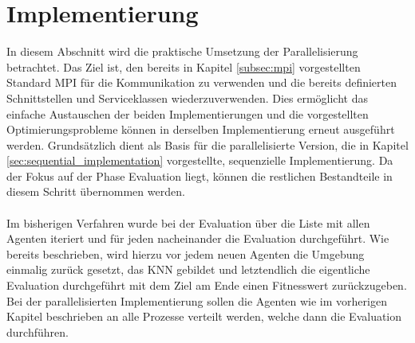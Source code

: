 \section{Implementierung} %
In diesem Abschnitt wird die praktische Umsetzung der Parallelisierung betrachtet. Das Ziel ist, den bereits in Kapitel \ref{subsec:mpi} vorgestellten Standard \ac{MPI} für die Kommunikation zu verwenden und die bereits definierten Schnittstellen und Serviceklassen wiederzuverwenden. Dies ermöglicht das einfache Austauschen der beiden Implementierungen und die vorgestellten Optimierungsprobleme können in derselben Implementierung erneut ausgeführt werden. Grundsätzlich dient als Basis für die parallelisierte Version, die in Kapitel \ref{sec:sequential_implementation} vorgestellte, sequenzielle Implementierung. Da der Fokus auf der Phase Evaluation liegt, können die restlichen Bestandteile in diesem Schritt übernommen werden.
\\\\
Im bisherigen Verfahren wurde bei der Evaluation über die Liste mit allen Agenten iteriert und für jeden nacheinander die Evaluation durchgeführt. Wie bereits beschrieben, wird hierzu vor jedem neuen Agenten die Umgebung einmalig zurück gesetzt, das \ac{KNN} gebildet und letztendlich die eigentliche Evaluation durchgeführt mit dem Ziel am Ende einen Fitnesswert zurückzugeben. Bei der parallelisierten Implementierung sollen die Agenten wie im vorherigen Kapitel beschrieben an alle Prozesse verteilt werden, welche dann die Evaluation durchführen. 
\\\\
